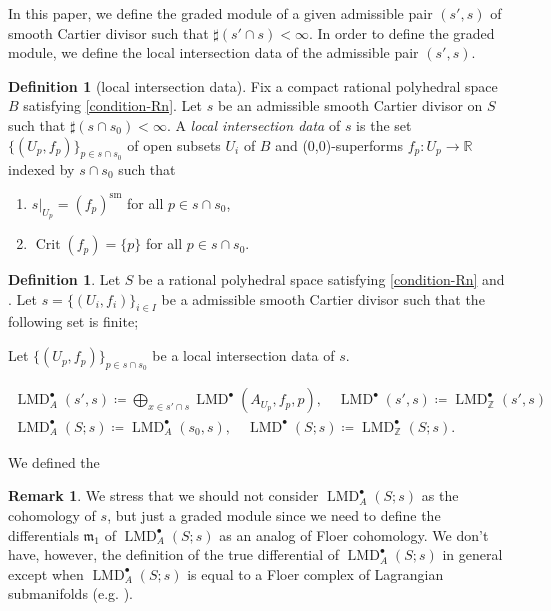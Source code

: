 \documentclass[a4paper,dvipdfmx,reqno,12pt]{amsart}
\theoremstyle{definition}
\newtheorem{definition}[theorem]{Definition}
\newtheorem{remark}[theorem]{Remark}
\newcommand{\deq}{\coloneqq}
\newcommand{\opn}[1]{\operatorname{#1}}
\numberwithin{equation}{section}
\begin{document}
In this paper, we
define the graded module of a given admissible pair 
$(s',s)$ of smooth Cartier divisor such that 
$\sharp (s'\cap s)<\infty$.
In order to define the graded module, we define the 
local intersection data of 
the admissible pair $(s',s)$.

\begin{definition}[{local intersection data}]
Fix a compact rational polyhedral space $B$ satisfying 
\cref{condition-Rn}.
Let $s$ be an admissible smooth Cartier divisor 
on $S$ such that $\sharp (s\cap s_0)<\infty$. 
A \emph{local intersection data} of $s$ is the set 
$\{(U_p,f_p)\}_{p\in s\cap s_0}$ of open subsets
$U_i$ of $B$ and (0,0)-superforms
$f_p\colon U_p \to \mathbb{R}$ indexed by 
$ s\cap s_0$ 
such that
\begin{enumerate}
\item $s|_{U_p}=(f_p)^{\mathrm{sm}}$
for all $p\in s\cap s_0$,
\item $\opn{Crit}(f_p)=\{p\}$ for all $p\in s\cap s_0$.
\end{enumerate}
\end{definition}


\begin{definition}
Let $S$ be a rational polyhedral space 
satisfying \cref{condition-Rn} and 
.
Let $s=\{(U_i,f_i)\}_{i\in I}$ be a admissible smooth Cartier divisor such that
the following set is finite;


Let $\{(U_p,f_p)\}_{p\in s\cap s_0}$ 
be a local intersection data of $s$.

\begin{align}
\opn{LMD}^{\bullet}_{A}(s',s)\deq 
\bigoplus_{x\in s' \cap s} 
\opn{LMD}^{\bullet}(A_{U_p},f_{p},p), \quad 
\opn{LMD}^{\bullet}(s',s)
\deq \opn{LMD}^{\bullet}_{\mathbb{Z}}(s',s)\\
\opn{LMD}^{\bullet}_A(S;s)
\deq \opn{LMD}^{\bullet}_{A}(s_0,s), \quad
\opn{LMD}^{\bullet}(S;s)\deq
\opn{LMD}^{\bullet}_{\mathbb{Z}}(S;s).
\end{align}
\end{definition}

We defined the 

\begin{remark}
\label{remark-differential-graded-module}
We stress that we should not consider 
$\opn{LMD}^{\bullet}_{A}(S;s)$ as the cohomology of $s$,
but just
a graded module 
since we need to define the differentials 
$\mathfrak{m}_1$ of 
$\opn{LMD}^{\bullet}_{A}(S;s)$ as an analog of
Floer cohomology. We don't have, however,
the definition of the true differential of 
$\opn{LMD}^{\bullet}_A(S;s)$ in general except when
$\opn{LMD}^{\bullet}_{A}(S;s)$ is equal to a Floer complex
of Lagrangian submanifolds (e.g. \cite[5.2]{MR1882331}).
\end{remark}
\end{document}

